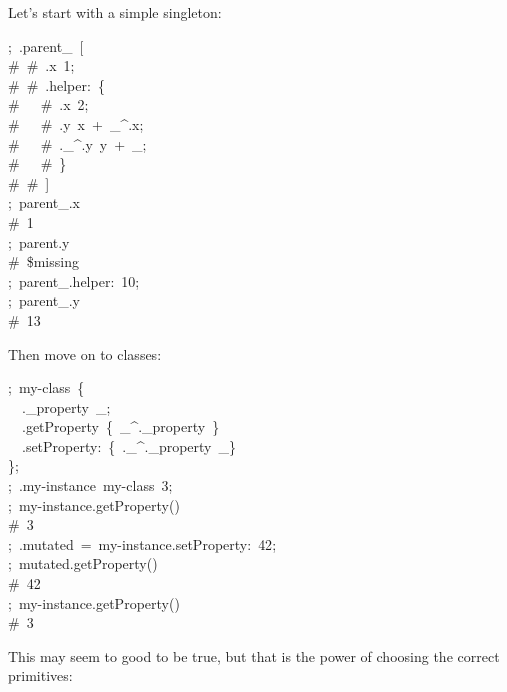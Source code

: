 \documentclass[preprint]{{sigplanconf}}
\begin{document}
\noindent{}Let's start with a simple singleton:%
\begin{mdpre}%
\noindent;~.parent\_~{}[\\
{\#~\#~.x~1;}\\
{\#~\#~.helper:~\{}\\
{\#~~~\#~.x~2;}\\
{\#~~~\#~.y~x~+~\_\textasciicircum{}.x;}\\
{\#~~~\#~.\_\textasciicircum{}.y~y~+~\_;}\\
{\#~~~\#~\}}\\
{\#~\#~]}\\
;~parent\_.x\\
{\#~1}\\
;~parent.y\\
{\#~\$missing}\\
;~parent\_.helper{:}~{10};\\
;~parent\_.y\\
{\#~13}%
\end{mdpre}\noindent{}Then move on to classes:
\begin{mdpre}%
\noindent;~my-{class}~\{\\
~~.\_property~\_;\\
~~.getProperty~\{~\_\textasciicircum{}.\_property~\}\\
~~.setProperty{:}~\{~.\_\textasciicircum{}.\_property~\_\}\\
\};\\
;~.my-instance~my-{class}~3;\\
;~my-instance.getProperty()\\
{\#~3}\\
;~.mutated~=~my-instance.setProperty{:}~{42};\\
;~mutated.getProperty()\\
{\#~42}\\
;~my-instance.getProperty()\\
{\#~3}%
\end{mdpre}\noindent{}This may seem to good to be true, but that is the power of choosing the correct primitives:
\end{document}
